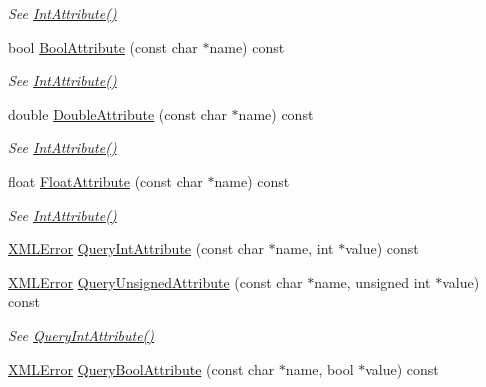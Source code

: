 \begin{DoxyCompactItemize}
\begin{DoxyCompactList}\small\item\em See \hyperlink{classtinyxml2_1_1_x_m_l_element_af86f05771c11a73a2896b662bb589ef5}{Int\+Attribute()} \end{DoxyCompactList}\item 
bool \hyperlink{classtinyxml2_1_1_x_m_l_element_a34811e4d1881e4ecc95c49f0f3799115}{Bool\+Attribute} (const char $\ast$name) const 
\begin{DoxyCompactList}\small\item\em See \hyperlink{classtinyxml2_1_1_x_m_l_element_af86f05771c11a73a2896b662bb589ef5}{Int\+Attribute()} \end{DoxyCompactList}\item 
double \hyperlink{classtinyxml2_1_1_x_m_l_element_a536922a5cae9c9769a3dc1b7a8ff0d44}{Double\+Attribute} (const char $\ast$name) const 
\begin{DoxyCompactList}\small\item\em See \hyperlink{classtinyxml2_1_1_x_m_l_element_af86f05771c11a73a2896b662bb589ef5}{Int\+Attribute()} \end{DoxyCompactList}\item 
float \hyperlink{classtinyxml2_1_1_x_m_l_element_a33b69f123f995aff966d2e351bc51b1f}{Float\+Attribute} (const char $\ast$name) const 
\begin{DoxyCompactList}\small\item\em See \hyperlink{classtinyxml2_1_1_x_m_l_element_af86f05771c11a73a2896b662bb589ef5}{Int\+Attribute()} \end{DoxyCompactList}\item 
\hyperlink{namespacetinyxml2_a1fbf88509c3ac88c09117b1947414e08}{X\+M\+L\+Error} \hyperlink{classtinyxml2_1_1_x_m_l_element_a8b92c729346aa8ea9acd59ed3e9f2378}{Query\+Int\+Attribute} (const char $\ast$name, int $\ast$value) const 
\item 
\hyperlink{namespacetinyxml2_a1fbf88509c3ac88c09117b1947414e08}{X\+M\+L\+Error} \hyperlink{classtinyxml2_1_1_x_m_l_element_aa3d8d1b9311da8fc249b4352749aaa84}{Query\+Unsigned\+Attribute} (const char $\ast$name, unsigned int $\ast$value) const 
\begin{DoxyCompactList}\small\item\em See \hyperlink{classtinyxml2_1_1_x_m_l_element_a8b92c729346aa8ea9acd59ed3e9f2378}{Query\+Int\+Attribute()} \end{DoxyCompactList}\item 
\hyperlink{namespacetinyxml2_a1fbf88509c3ac88c09117b1947414e08}{X\+M\+L\+Error} \hyperlink{classtinyxml2_1_1_x_m_l_element_a2a58ee941c3cda23772c887a8f8b534e}{Query\+Bool\+Attribute} (const char $\ast$name, bool $\ast$value) const 

\end{DoxyCompactItemize}

